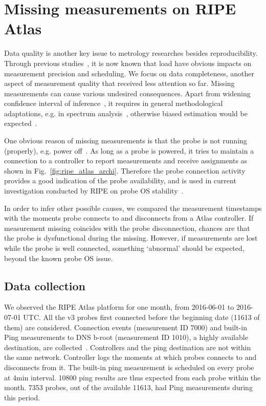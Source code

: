 \section{Missing measurements on RIPE Atlas}
\label{sec:miss_atlas}
Data quality is another key issue to metrology researches besides reproducibility.
Through previous studies~\cite{Holterbach2015a, Bajpai2015}, it is now known that load have obvious impacts on measurement precision and scheduling.
We focus on data completeness, another aspect of measurement quality that received less attention so far. Missing measurements can cause various undesired consequences. Apart from widening confidence interval of inference~\cite{Fontugne2016}, it requires in general methodological adaptations, e.g. in spectrum analysis~\cite{Babu2010, Luckie2014, shao2016}, otherwise biased estimation would be expected~\cite{Baraldi2010}.

One obvious reason of missing measurements is that the probe is not running (properly), e.g. power off~\cite{schedule}.
As long as a probe is powered, it tries to maintain a connection to a controller to report measurements and receive assignments as shown in Fig.~\ref{fig:ripe_atlas_archi}. 
Therefore the probe connection activity provides a good indication of the probe availability, and is used in current investigation conducted by RIPE on probe OS stability~\cite{1look, 2look, 3look}.

In order to infer other possible causes, we compared the measurement timestamps with the moments probe connects to and disconnects from a Atlas controller.
If measurement missing coincides with the probe disconnection, chances are that the probe is dysfunctional during the missing. However, if measurements are lost while the probe is well connected, something `abnormal' should be expected, beyond the known probe OS issue.

\subsection{Data collection}
We observed the RIPE Atlas platform for one month, from 2016-06-01 to 2016-07-01 UTC.
All the v3 probes first connected before the beginning date (11613 of them) are considered.
Connection events (measurement ID 7000) and built-in Ping measurements to DNS b-root (measurement ID 1010), a highly available destination, are collected~\cite{built-in}. 
Controllers and the ping destination are not within the same network.
Controller logs the moments at which probes connects to and disconnects from it.
The built-in ping measurement is scheduled on every probe at 4min interval. 
10800 ping results are thus expected from each probe within the month.
7353 probes, out of the available 11613, had Ping measurements during this period.

